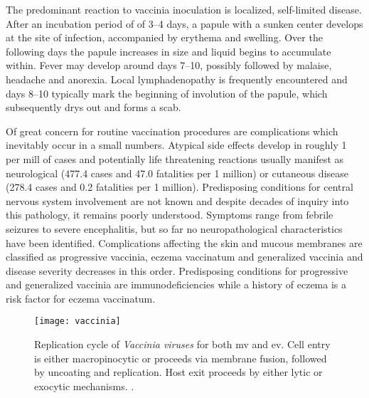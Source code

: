 The predominant reaction to vaccinia inoculation is localized, self-limited disease. After an incubation period of of 3--4 days, a papule with a sunken center develops at the site of infection, accompanied by erythema and swelling. Over the following days the papule increases in size and liquid begins to accumulate within. Fever may develop around days 7--10, possibly followed by malaise, headache and anorexia. Local lymphadenopathy is frequently encountered and days 8--10 typically mark the beginning of involution of the papule, which subsequently drys out and forms a scab.

Of great concern for routine vaccination procedures are complications which inevitably occur in a small numbers. Atypical side effects develop in roughly 1 per mill of cases and potentially life threatening reactions usually manifest as neurological (477.4 cases and 47.0 fatalities per 1 million) or cutaneous disease (278.4 cases and 0.2 fatalities per 1 million). Predisposing conditions for central nervous system involvement are not known and despite decades of inquiry into this pathology, it remains poorly understood. Symptoms range from febrile seizures to severe encephalitis, but so far no  neuropathological characteristics have been identified. Complications affecting the skin and mucous membranes are classified as progressive vaccinia, eczema vaccinatum and generalized vaccinia and disease severity decreases in this order. Predisposing conditions for progressive and generalized vaccinia are immunodeficiencies while a history of eczema is a risk factor for eczema vaccinatum.

\begin{figure}[t]
  \centering
  \texttt{[image: vaccinia]}
  \caption[Replication cycle of \textit{Vaccinia viruses} for both intracellular mature and extracellular enveloped virions.]{Replication cycle of \textit{Vaccinia viruses} for both \acrfull{mv} and \acrfull{ev}. Cell entry is either macropinocytic or proceeds via membrane fusion, followed by uncoating and replication. Host exit proceeds by either lytic or exocytic mechanisms. \citep{Hulo2011}.}
  \label{fig:vaccinia}
\end{figure}

